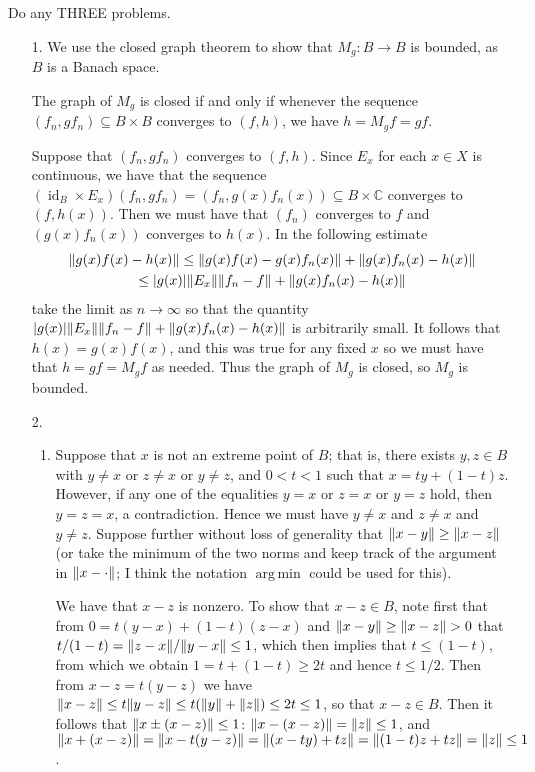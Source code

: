 \documentclass[11pt]{article}
\DeclareMathOperator{\id}{id}
\DeclareMathOperator*{\argmin}{arg\,min}
\begin{document}
Do any THREE problems.
\begin{enumerate}
    \item[1.] We use the closed graph theorem to show that $M_g\colon B\to B$ is bounded, as $B$ is a Banach space.
    
    The graph of $M_g$ is closed if and only if whenever the sequence $(f_n,gf_n)\subseteq B\times B$ converges to $(f,h)$, we have $h = M_g f = gf$. 
    
    Suppose that $(f_n,gf_n)$ converges to $(f,h)$. Since $E_x$ for each $x\in X$ is continuous, we have that the sequence $(\id_B\times E_x)(f_n,gf_n) = (f_n,g(x)f_n(x))\subseteq B\times \mathbb{C}$ converges to $(f,h(x))$. Then we must have that $(f_n)$ converges to $f$ and $(g(x)f_n(x))$ converges to $h(x)$. In the following estimate \begin{multline*}
      \norm{g(x)f(x)-h(x)} \leq \norm{g(x)f(x)-g(x)f_n(x)} + \norm{g(x)f_n(x)-h(x)}\\\leq \abs{g(x)}\norm{E_x}\norm{f_n-f}+\norm{g(x)f_n(x)-h(x)}
    \end{multline*} take the limit as $n\to \infty$ so that the quantity $\abs{g(x)}\norm{E_x}\norm{f_n-f}+\norm{g(x)f_n(x)-h(x)}$ is arbitrarily small. It follows that $h(x) = g(x)f(x)$, and this was true for any fixed $x$ so we must have that $h = gf =M_gf$ as needed. Thus the graph of $M_g$ is closed, so $M_g$ is bounded.

    \item[2.] \begin{enumerate}
      \item Suppose that $x$ is not an extreme point of $B$; that is, there exists $y,z\in B$ with $y\neq x$ or $z\neq x$ or $y\neq z$, and $0<t<1$ such that $x = ty+(1-t)z$. However, if any one of the equalities $y=x$ or $z=x$ or $y=z$ hold, then $y=z=x$, a contradiction. Hence we must have $y\neq x$ and $z\neq x$ and $y\neq z$. Suppose further without loss of generality that $\norm{x-y}\geq \norm{x-z}$ (or take the minimum of the two norms and keep track of the argument in $\norm{x-\cdot}$; I think the notation $\argmin$ could be used for this).
      
      We have that $x-z$ is nonzero. To show that $x-z\in B$, note first that from $0 = t(y-x)+(1-t)(z-x)$ and $\norm{x-y}\geq \norm{x-z}>0$ that $t/(1-t)= \norm{z-x}/\norm{y-x}\leq 1$, which then implies that $t\leq (1-t)$, from which we obtain $1= t+(1-t)\geq 2t$ and hence $t\leq 1/2$. Then from $x-z = t(y-z)$ we have $\norm{x-z}\leq t\norm{y-z}\leq t(\norm{y}+\norm{z})\leq 2t\leq 1$, so that $x-z\in B$. Then it follows that $\norm{x\pm(x-z)}\leq 1$: $\norm{x-(x-z)}=\norm{z}\leq 1$, and $\norm{x+(x-z)}=\norm{x-t(y-z)}=\norm{(x-ty)+tz}=\norm{(1-t)z+tz}=\norm{z}\leq 1$.


\end{enumerate}
\end{enumerate}
\end{document}
